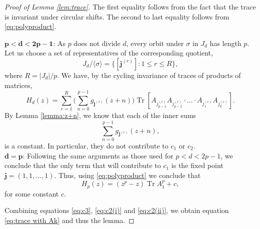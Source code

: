 \documentclass[10pt,a4paper]{amsart}
\begin{document}
\begin{proof}[Proof of Lemma \ref{lem:trace}]
    The first equality follows from the fact that the trace is invariant under circular shifts. The second to last equality follows from \eqref{eq:polyproduct}.
    \item $\mathbf{p< d <2p-1}$: 
As $p$ does not divide $d$, every orbit under $\sigma$ in $J_d$ has length $p$. Let us choose a set of representatives of the corresponding quotient,
\begin{equation*}
    J_d/\langle \sigma \rangle =\{[\mathbf{j}^{(r)}]:1\leq r \leq R\},
\end{equation*}
where $R=|J_d|/p$. We have, by the cycling invariance of traces of products of matrices,
\begin{equation*}
   H_d(z)=\sum_{r=1}^R\Big( \sum_{n=0}^{p-1}g_{\mathbf{j}^{(r)}}(z+n) \Big) \operatorname{Tr}\left[A_{j_{p-1}^{(r)}}A_{j_{p-2}^{(r)}}\cdot\ldots\cdot A_{j_1^{(r)}}A_{j_0^{(r)}}\right].
\end{equation*}
By Lemma \ref{lemma:z+n}, we know that each of the inner sums
\begin{equation*}
    \sum_{n=0}^{p-1} g_{\mathbf{j}^{(r)}}(z+n),
\end{equation*}
is a constant. In particular, they do not contribute to $c_1$ or $c_2$.\\
$\mathbf{d=p}$: Following the same arguments as those used for $p<d<2p-1$, we conclude that the only term that will contribute to $c_1$ is the fixed point $\mathbf{j} = (1,1,...,1)$. Thus, using \eqref{eq:polyproduct} we conclude that
\begin{equation}
    H_{p}(z) = (z^p-z)\operatorname{Tr}A_1^p+c, \label{eq:c2(ii)}
\end{equation}
for some constant $c$.

Combining equations \eqref{eq:c3}, \eqref{eq:c2(i)} and \eqref{eq:c2(ii)}, we obtain  equation \eqref{eq:trace with Ak} and thus the lemma.
\end{proof}
\end{document}
